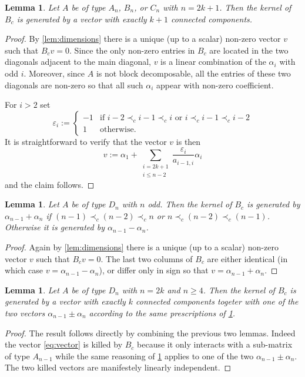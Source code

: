 \documentclass[11pt]{amsart}
\newtheorem{lemma}[theorem]{Lemma}
\numberwithin{equation}{section}
\begin{document}
  \begin{lemma}
    Let $A$ be of type $A_n$, $B_n$, or $C_n$ with $n=2k+1$.
    Then the kernel of $B_c$ is generated by a vector with exactly $k+1$ connected components.
  \end{lemma}
  \begin{proof}
    By \cref{lem:dimensions} there is a unique (up to a scalar) non-zero vector $v$ such that $B_cv=0$.
    Since the only non-zero entries in $B_c$ are located in the two diagonals adjacent to the main diagonal, $v$ is a linear combination of the $\alpha_i$ with odd $i$.
    Moreover, since $A$ is not block decomposable, all the entries of these two diagonals are non-zero so that all such $\alpha_i$ appear with non-zero coefficient.

    For $i>2$ set 
    \[
      \varepsilon_i :=
      \begin{cases}
        -1 & \text{if $i-2\prec_c i-1 \prec_c i$ or $i\prec_c i-1 \prec_c i-2$}\\
        1 & \text{otherwise.}
      \end{cases}
    \]
    It is straightforward to verify that the vector $v$ is then
    \begin{equation}
      \label{eq:vector}
      v := 
      \alpha_1 + \sum_{\substack{i=2k+1\\i\leq n-2}} \frac{\varepsilon_i}{a_{i-1,i}} \alpha_i
    \end{equation}
    and the claim follows.
  \end{proof}
  
  \begin{lemma}
    \label{lem:ker_Dn_even}
    Let $A$ be of type $D_n$ with $n$ odd.
    Then the kernel of $B_c$ is generated by $\alpha_{n-1}+\alpha_n$ if $(n-1) \prec_c (n-2) \prec_c n$ or $n \prec_c (n-2) \prec_c (n-1)$.
    Otherwise it is generated by $\alpha_{n-1}-\alpha_n$.
  \end{lemma}
  \begin{proof}
    Again by \cref{lem:dimensions} there is a unique (up to a scalar) non-zero vector $v$ such that $B_cv=0$.
    The last two columns of $B_c$ are either identical (in which case $v=\alpha_{n-1}-\alpha_n$), or differ only in sign so that $v=\alpha_{n-1}+\alpha_n$.
  \end{proof}

  \begin{lemma}
    Let $A$ be of type $D_n$ with $n=2k$ and $n\geq 4$.
    Then the kernel of $B_c$ is generated by a vector with exactly $k$ connected components togeter with one of the two vectors $\alpha_{n-1}\pm\alpha_n$ according to the same prescriptions of \cref{lem:ker_Dn_even}.
  \end{lemma}
  \begin{proof}
    The result follows directly by combining the previous two lemmas. 
    Indeed the vector \cref{eq:vector} is killed by $B_c$ because it only interacts with a sub-matrix of type $A_{n-1}$ while the same reasoning of \cref{lem:ker_Dn_even} applies to one of the two $\alpha_{n-1}\pm\alpha_n$.
    The two killed vectors are manifestely linearly independent.
  \end{proof}
\end{document}
